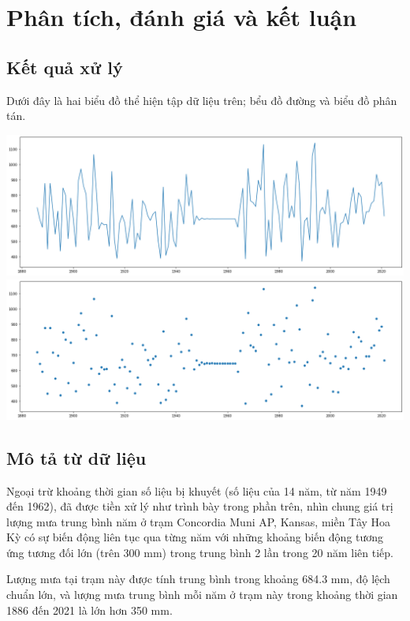 \documentclass[a4paper]{article}
\begin{document}
\section{Phân tích, đánh giá và kết luận}
\subsection{Kết quả xử lý}
Dưới đây là hai biểu đồ thể hiện tập dữ liệu trên; bểu đồ đường và biểu đồ phân tán.
\begin{center}
\includegraphics[scale=0.45]{images/line.png}
\includegraphics[scale=0.45]{images/scatterplot.png}
\end{center}
\subsection{Mô tả từ dữ liệu}
Ngoại trừ khoảng thời gian số liệu bị khuyết (số liệu của 14 năm, từ năm 1949 đến 1962), đã được tiền xử lý như trình bày trong phần trên, nhìn chung giá trị lượng mưa trung bình năm ở trạm Concordia Muni AP, Kansas, miền Tây Hoa Kỳ có sự biến động liên tục qua từng năm với những khoảng biến động tương ứng tương đối lớn (trên 300 mm) trong trung bình 2 lần trong 20 năm liên tiếp. 

Lượng mưa tại trạm này được tính trung bình trong khoảng 684.3 mm, độ lệch chuẩn lớn, và lượng mưa trung bình mỗi năm ở trạm này trong khoảng thời gian 1886 đến 2021 là lớn hơn 350 mm.
\end{document}
